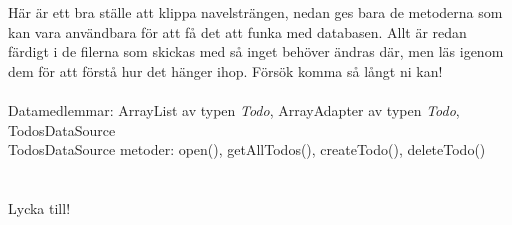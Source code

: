 \documentclass[11 pt, titlepage]{article} %
\begin{document}
Här är ett bra ställe att klippa navelsträngen, nedan ges bara de metoderna som kan vara användbara för att få det att funka med databasen.
Allt är redan färdigt i de filerna som skickas med så inget behöver ändras där, men läs igenom dem för att förstå hur det hänger ihop.
Försök komma så långt ni kan!\\ \\

Datamedlemmar: ArrayList av typen \textit{Todo}, ArrayAdapter av typen \textit{Todo}, TodosDataSource \\
TodosDataSource metoder: open(), getAllTodos(), createTodo(), deleteTodo() \\

\\ \\

Lycka till!
\end{document}
